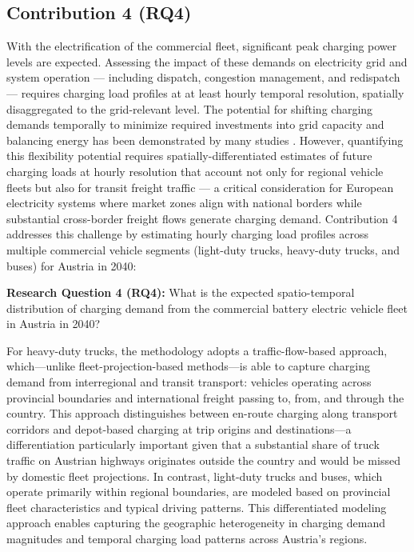     \subsection{Contribution 4 (RQ4)}
    With the electrification of the commercial fleet, significant peak charging power levels are expected. Assessing the impact of these demands on electricity grid and system operation — including dispatch, congestion management, and redispatch — requires charging load profiles at at least hourly temporal resolution, spatially disaggregated to the grid-relevant level. The potential for shifting charging demands temporally to minimize required investments into grid capacity and balancing energy has been demonstrated by many studies \cite{CROZIER2020114973}. However, quantifying this flexibility potential requires spatially-differentiated estimates of future charging loads at hourly resolution that account not only for regional vehicle fleets but also for transit freight traffic — a critical consideration for European electricity systems where market zones align with national borders while substantial cross-border freight flows generate charging demand. Contribution 4 addresses this challenge by estimating hourly charging load profiles across multiple commercial vehicle segments (light-duty trucks, heavy-duty trucks, and buses) for Austria in 2040:
    
    \textbf{Research Question 4 (RQ4):} What is the expected spatio-temporal distribution of charging demand from the commercial battery electric vehicle fleet in Austria in 2040?

    For heavy-duty trucks, the methodology adopts a traffic-flow-based approach, which—unlike fleet-projection-based methods—is able to capture charging demand from interregional and transit transport: vehicles operating across provincial boundaries and international freight passing to, from, and through the country. This approach distinguishes between en-route charging along transport corridors and depot-based charging at trip origins and destinations—a differentiation particularly important given that a substantial share of truck traffic on Austrian highways originates outside the country and would be missed by domestic fleet projections. In contrast, light-duty trucks and buses, which operate primarily within regional boundaries, are modeled based on provincial fleet characteristics and typical driving patterns. This differentiated modeling approach enables capturing the geographic heterogeneity in charging demand magnitudes and temporal charging load patterns across Austria's regions.


